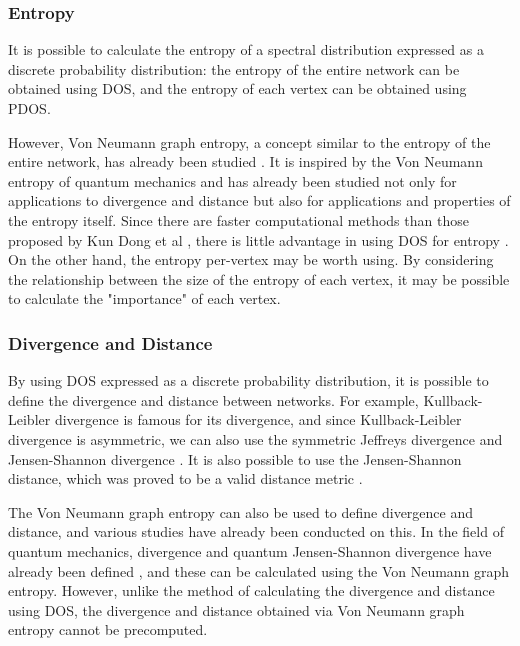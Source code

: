 \documentclass[senior,final,11pt]{iscs-thesis}
\begin{document}
\subsubsection{Entropy}
It is possible to calculate the entropy of a spectral distribution expressed as a discrete probability distribution: the entropy of the entire network can be obtained using DOS, and the entropy of each vertex can be obtained using PDOS.

However, Von Neumann graph entropy, a concept similar to the entropy of the entire network, has already been studied \cite{braunstein2006laplacian, chen2019fast,tsitsulin2020just}. It is inspired by the Von Neumann entropy of quantum mechanics and has already been studied not only for applications to divergence and distance but also for applications and properties of the entropy itself. Since there are faster computational methods \cite{chen2019fast,tsitsulin2020just} than those proposed by Kun Dong et al \cite{dong2019network}, there is little advantage in using DOS for entropy .
On the other hand, the entropy per-vertex may be worth using. By considering the relationship between the size of the entropy of each vertex, it may be possible to calculate the "importance" of each vertex.


\subsubsection{Divergence and Distance}
By using DOS expressed as a discrete probability distribution, it is possible to define the divergence and distance between networks. For example, Kullback-Leibler divergence \cite{kullback1951information} is famous for its divergence, and since Kullback-Leibler divergence is asymmetric, we can also use the symmetric Jeffreys divergence and Jensen-Shannon divergence \cite{nielsen2019jensen, lin1991divergence, jeffreys1946invariant}. It is also possible to use the Jensen-Shannon distance, which was proved to be a valid distance metric \cite{endres2003new}.

The Von Neumann graph entropy can also be used to define divergence and distance, and various studies have already been conducted on this. In the field of quantum mechanics, divergence and quantum Jensen-Shannon divergence have already been defined \cite{briet2009properties, lamberti2008metric}, and these can be calculated using the Von Neumann graph entropy. However, unlike the method of calculating the divergence and distance using DOS, the divergence and distance obtained via Von Neumann graph entropy cannot be precomputed.
\end{document}
